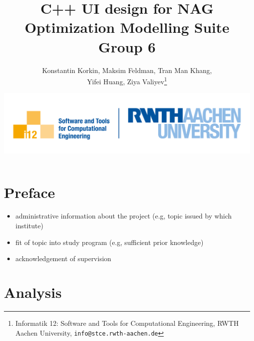 \documentclass{book}
\title{\bf C++ UI design for NAG Optimization Modelling Suite \\
{\small Group 6}}
\author{Konstantin Korkin, Maksim Feldman, Tran Man Khang, \\Yifei Huang, Ziya Valiyev\footnote{Informatik 12: Software and Tools for Computational Engineering, RWTH Aachen University, {\tt info@stce.rwth-aachen.de}}}
\date{\includegraphics[width=.6\textwidth]{rwth_i12_softw-werkz_en_rgb}}
\begin{document}

\pagestyle{headings}

\maketitle

\tableofcontents

\chapter*{Preface}

\begin{itemize}
\item administrative information about the project (e.g, topic issued by which institute)
\item fit of topic into study program (e.g, sufficient prior knowledge)
\item acknowledgement of supervision
\end{itemize}

\chapter{Analysis} \label{ch:analysis}
\end{document}
